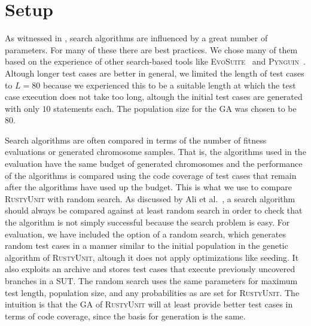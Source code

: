 \documentclass[paper=a4,%
  twoside,%
  BCOR4mm,%
  abstract=true,%
  toc=bibliography,%
  chapterprefix=true,%
  toc=bibliographynumbered,%
  open=right,%
  english,%
  pagesize=pdftex]{scrreprt}
\newcommand{\tech}{\textsc{RustyUnit}\xspace}
\newcommand{\sut}{\ac{SUT}\xspace}
\begin{document}
\section{Setup}
\label{sec:environment-setup}
As witnessed in , search algorithms are influenced by a great number of parameters. For many of these there are best practices. We chose many of them based on the experience of other search-based tools like \textsc{EvoSuite}~\cite{Fraser_2011a} and \textsc{Pynguin}~\cite{Lukasczyk2020}. Altough longer test cases are better in general, we limited the length of test cases to $L = 80$ because we experienced this to be a suitable length at which the test case execution does not take too long, altough the initial test cases are generated with only $10$ statements each. The population size for the \ac{GA} was chosen to be $80$.

Search algorithms are often compared in terms of the number of fitness evaluations or generated chromosome samples. That is, the algorithms used in the evaluation have the same budget of generated chromosomes and the performance of the algorithms is compared using the code coverage of test cases that remain after the algorithms have used up the budget. This is what we use to compare \tech with random search. As discussed by Ali et al.~\cite{Ali2010}, a search algorithm should always be compared against at least random search in order to check that the algorithm is not simply successful because the search problem is easy. For evaluation, we have included the option of a random search, which generates random test cases in a manner similar to the initial population in the genetic algorithm of \tech, altough it does not apply optimizations like seeding. It also exploits an archive and stores test cases that execute previously uncovered branches in a \sut. The random search uses the same parameters for maximum test length, population size, and any probabilities as are set for \tech. The intuition is that the \ac{GA} of \tech will at least provide better test cases in terms of code coverage, since the basis for generation is the same. %

\end{document}
